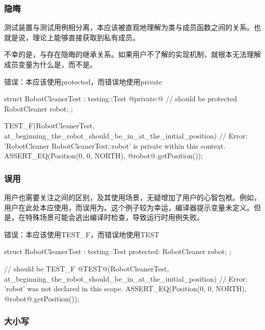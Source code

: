 \begin{content}
\subsubsection{隐晦}

测试装置与测试用例相分离，本应该被直观地理解为类与成员函数之间的关系。也就是说，理论上能够直接获取到私有成员。

不幸的是，与存在隐晦的继承关系。如果用户不了解的实现机制，就根本无法理解成员变量为什么是，而不是。

\begin{nodiff}{错误：本应该使用protected，而错误地使用private}
 \begin{c++}
struct RobotCleanerTest : testing::Test {
@private:@ // should be protected
  RobotCleaner robot;
};
 
TEST_F(RobotCleanerTest, at_beginning_the_robot_should_be_in_at_the_initial_position) {
  // Error: 'RobotCleaner RobotCleanerTest::robot' is private within this context.
  ASSERT_EQ(Position(0, 0, NORTH), @robot@.getPosition());
}
  \end{c++}
\end{nodiff}

\subsubsection{误用}

用户也需要关注之间的区别，及其使用场景，无疑增加了用户的心智包袱。例如，用户在此处本应使用，而误用为。这个例子较为幸运，编译器提示变量未定义。但是，在特殊场景可能会逃出编译时检查，导致运行时用例失败。

\begin{nodiff}{错误：本应该使用TEST\_F，而错误地使用TEST}
 \begin{c++}
struct RobotCleanerTest : testing::Test {
protected:
  RobotCleaner robot;
};

// should be TEST\_F
@TEST@(RobotCleanerTest, at_beginning_the_robot_should_be_in_at_the_initial_position) {
  // Error: 'robot' was not declared in this scope.
  ASSERT_EQ(Position(0, 0, NORTH), @robot@.getPosition());
}
  \end{c++}
\end{nodiff}

\subsubsection{大小写}


\end{content}

